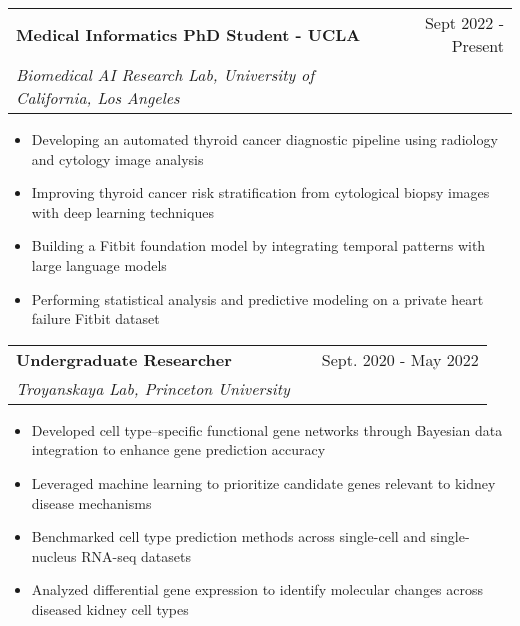 \documentclass[a4paper,12pt]{article}
\makeatletter
\newenvironment{joblong}[3]
    {
    \begin{tabularx}{\linewidth}{@{}l X r@{}}
    \textbf{#1} & \hfill &  #2 \\
    \textit{#3} & & \\[3.75pt]  
    \end{tabularx}
    \begin{minipage}[t]{\linewidth}
    \begin{itemize}[nosep,after=\strut, leftmargin=1em, itemsep=3pt,label=\scriptsize$\bullet$]
    }
    {
    \end{itemize}
    \end{minipage}    
    }
\makeatother
\begin{document}
\begin{joblong}{Medical Informatics PhD Student - UCLA}{Sept 2022 - Present}{Biomedical AI Research Lab, University of California, Los Angeles}
\item Developing an automated thyroid cancer diagnostic pipeline  using radiology and cytology image analysis
\item Improving thyroid cancer risk stratification from cytological biopsy images with deep learning techniques
\item Building a Fitbit foundation model by integrating temporal patterns with large language models
\item Performing statistical analysis and predictive modeling on a private heart failure Fitbit dataset
\end{joblong}

\begin{joblong}{Undergraduate Researcher}{Sept. 2020 - May 2022}{Troyanskaya Lab, Princeton University}
\item Developed cell type–specific functional gene networks through Bayesian data integration to enhance gene prediction accuracy
\item Leveraged machine learning to prioritize candidate genes relevant to kidney disease mechanisms
\item Benchmarked cell type prediction methods across single-cell and single-nucleus RNA-seq datasets 
\item Analyzed differential gene expression to identify molecular changes across diseased kidney cell types
\end{joblong}
\end{document}
